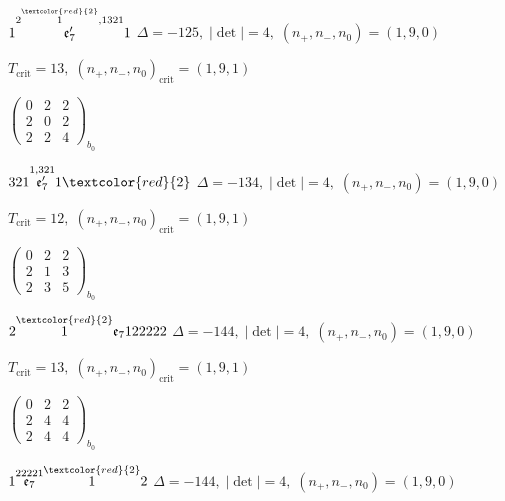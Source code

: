 \documentclass[10pt]{article}
\begin{document}
\smallskip

$1\overset{2\overset{\textcolor{red}{2}}{1},1321}{\mathfrak{e}_7'}1$ \quad $\Delta=-125,\; |\det|=4,\; (n_+,n_-,n_0)=(1,9,0)$

\hspace{1em}$T_{\text{crit}}=13,\; (n_+,n_-,n_0)_{\text{crit}}=(1,9,1)$

\hspace{2em}$\left(\begin{smallmatrix}0 & 2 & 2 \\ 2 & 0 & 2 \\ 2 & 2 & 4\end{smallmatrix}\right)_{\!b_0}$

\smallskip

$321\overset{1,321}{\mathfrak{e}_7'}1\textcolor{red}{2}$ \quad $\Delta=-134,\; |\det|=4,\; (n_+,n_-,n_0)=(1,9,0)$

\hspace{1em}$T_{\text{crit}}=12,\; (n_+,n_-,n_0)_{\text{crit}}=(1,9,1)$

\hspace{2em}$\left(\begin{smallmatrix}0 & 2 & 2 \\ 2 & 1 & 3 \\ 2 & 3 & 5\end{smallmatrix}\right)_{\!b_0}$

\smallskip

$2\overset{\textcolor{red}{2}}{1}\mathfrak{e}_7122222$ \quad $\Delta=-144,\; |\det|=4,\; (n_+,n_-,n_0)=(1,9,0)$

\hspace{1em}$T_{\text{crit}}=13,\; (n_+,n_-,n_0)_{\text{crit}}=(1,9,1)$

\hspace{2em}$\left(\begin{smallmatrix}0 & 2 & 2 \\ 2 & 4 & 4 \\ 2 & 4 & 4\end{smallmatrix}\right)_{\!b_0}$

\smallskip

$1\overset{22221}{\mathfrak{e}_7}\overset{\textcolor{red}{2}}{1}2$ \quad $\Delta=-144,\; |\det|=4,\; (n_+,n_-,n_0)=(1,9,0)$
\end{document}
